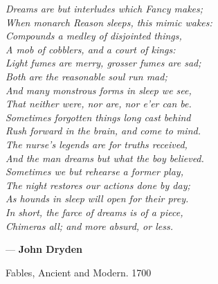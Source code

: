 
\newlength\longest
\null\vfill

\settowidth{}%
\centering
\parbox{\longest}
{
\raggedright{
{\book\fontsize{75}{0}\selectfont%
\color{ctcolorgraylight}%
\textit{\grqq}%
}
\Large\itshape%
Dreams are but interludes which Fancy makes;\\
When monarch Reason sleeps, this mimic wakes:\\
Compounds a medley of disjointed things,\\
A mob of cobblers, and a court of kings:\\
Light fumes are merry, grosser fumes are sad;\\
Both are the reasonable soul run mad;\\
And many monstrous forms in sleep we see,\\
That neither were, nor are, nor e'er can be.\\
Sometimes forgotten things long cast behind\\
Rush forward in the brain, and come to mind.\\
The nurse's legends are for truths received,\\
And the man dreams but what the boy believed.\\
Sometimes we but rehearse a former play,\\
The night restores our actions done by day;\\
As hounds in sleep will open for their prey.\\
In short, the farce of dreams is of a piece,\\
Chimeras all; and more absurd, or less. \\
}
\raggedleft
{\book\fontsize{75}{0}\selectfont%
\color{ctcolorgraylight}%
\textit{\glqq}%
}
\par\vspace*{.75cm}
\Large
{
--- \textbf{John Dryden}\par
Fables, Ancient and Modern. 1700
}
}

\vfill\vfill

\cleardoublepage
